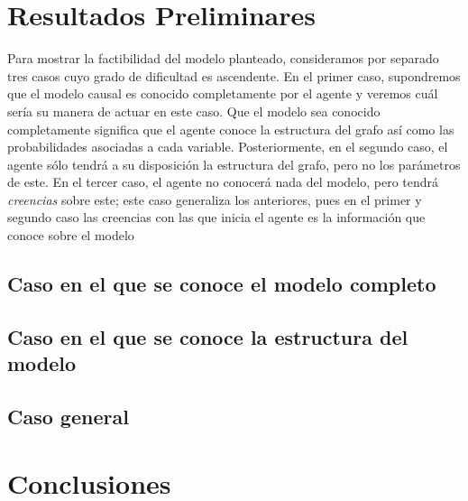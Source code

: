 \documentclass[11pt]{article}
\theoremstyle{plain}
\begin{document}
\section{Resultados Preliminares}
Para mostrar la factibilidad del modelo planteado, consideramos por separado tres casos cuyo grado de dificultad es ascendente. En el primer caso, supondremos que el modelo causal es conocido completamente por el agente y veremos cuál sería su manera de actuar en este caso. Que el modelo sea conocido completamente significa que el agente conoce la estructura del grafo así como las probabilidades asociadas a cada variable. Posteriormente, en el segundo caso, el agente sólo tendrá a su disposición la estructura del grafo, pero no los parámetros de este. En el tercer caso, el agente no conocerá nada del modelo, pero tendrá \textit{creencias} sobre este; este caso generaliza los anteriores, pues en el primer y segundo caso las creencias con las que inicia el agente es la información que conoce sobre el modelo
\subsection{Caso en el que se conoce el modelo completo}
\subsection{Caso en el que se conoce la estructura del modelo}
\subsection{Caso general}
\section{Conclusiones}



\end{document}
